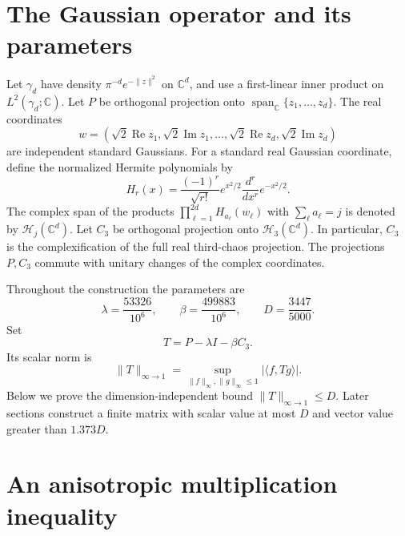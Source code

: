 \documentclass[11pt]{article}
\theoremstyle{remark}\newtheorem{remark}[theorem]{Remark}
\newcommand{\C}{\mathbb C}
\newcommand{\ip}[2]{\langle #1,#2\rangle}
\newcommand{\norm}[1]{\lVert #1\rVert}
\DeclareMathOperator{\Rea}{Re}
\begin{document}
\section{The Gaussian operator and its parameters}

Let \(\gamma_d\) have density \(\pi^{-d}e^{-\norm z^2}\) on
\(\C^d\), and use a first-linear inner product on
\(L^2(\gamma_d;\C)\). Let \(P\) be orthogonal projection onto
\(\operatorname{span}_{\C}\{z_1,\ldots,z_d\}\). The real coordinates
\[
w=(\sqrt2\Rea z_1,\sqrt2\operatorname{Im}z_1,\ldots,
\sqrt2\Rea z_d,\sqrt2\operatorname{Im}z_d)
\]
are independent standard Gaussians. For a standard real Gaussian
coordinate, define the normalized Hermite polynomials by
\[
H_r(x)=\frac{(-1)^r}{\sqrt{r!}}e^{x^2/2}
\frac{d^r}{dx^r}e^{-x^2/2}.
\]
The complex span of the products
\(\prod_{\ell=1}^{2d}H_{a_\ell}(w_\ell)\) with
\(\sum_\ell a_\ell=j\) is denoted by \(\mathcal H_j(\C^d)\).
Let \(C_3\) be orthogonal projection onto \(\mathcal H_3(\C^d)\).
In particular, \(C_3\) is the complexification of the full real
third-chaos projection. The projections \(P,C_3\) commute with
unitary changes of the complex coordinates.

Throughout the construction the parameters are
\begin{equation}\label{eq:parameters}
\lambda=\frac{53326}{10^6},\qquad
\beta=\frac{499883}{10^6},\qquad D=\frac{3447}{5000}.
\end{equation}
Set
\begin{equation}\label{eq:T}
T=P-\lambda I-\beta C_3.
\end{equation}
Its scalar norm is
\[
\norm T_{\infty\to1}
=\sup_{\norm f_\infty,\norm g_\infty\le1}|\ip f{Tg}|.
\]
Below we prove the dimension-independent bound
\(\norm T_{\infty\to1}\le D\). Later sections construct a finite
matrix with scalar value at most \(D\) and vector value greater than
\(1.373D\).

\section{An anisotropic multiplication inequality}
\end{document}
